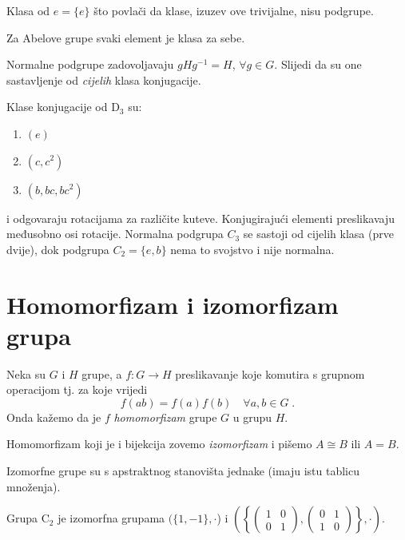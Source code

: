 Klasa od $e=\{e\}$ što povlači da klase, izuzev ove trivijalne, nisu podgrupe.

Za Abelove grupe svaki element je klasa za sebe.

Normalne podgrupe zadovoljavaju $gHg^{-1}=H$, $\forall g\in G$. Slijedi
da su one sastavljenje od \emph{cijelih} klasa konjugacije.

\begin{primjer}[D$_3$]
Klase konjugacije  od D$_3$ su:
\begin{enumerate}[-]
\item $(e)$
\item $(c, c^{2})$
\item $(b, bc, bc^2)$
\end{enumerate}
i odgovaraju rotacijama za različite kuteve. Konjugirajući elementi
preslikavaju međusobno osi rotacije. Normalna podgrupa $C_3$ se
sastoji od cijelih klasa (prve dvije), dok podgrupa $C_2=\{e,b\}$ nema
to svojstvo i nije normalna.
\end{primjer}


\section{Homomorfizam i izomorfizam grupa}

\begin{definicija}[Homomorfizam]
Neka su $G$ i $H$ grupe, a $f:G\to H$ preslikavanje koje komutira
s grupnom operacijom tj. za koje vrijedi
\begin{displaymath}
      f(ab)=f(a)f(b) \quad \forall a,b\in G \;.
\end{displaymath}
Onda kažemo da je $f$ \emph{homomorfizam} grupe $G$ u grupu $H$.
\end{definicija}

Homomorfizam koji je i bijekcija zovemo \emph{izomorfizam} i
pišemo $A\cong B$ ili $A=B$.

Izomorfne grupe su s apstraktnog stanovišta jednake (imaju
istu tablicu množenja).

\begin{primjer}[C$_2$]
Grupa C$_2$ je izomorfna grupama $(\{1, -1\},\cdot$) i
$\left(\left\{
\begin{pmatrix}
1 & 0 \\ 0 & 1
\end{pmatrix},
\begin{pmatrix}
0 & 1 \\ 1 & 0
\end{pmatrix}
\right\},\cdot\right)$.
\end{primjer}

